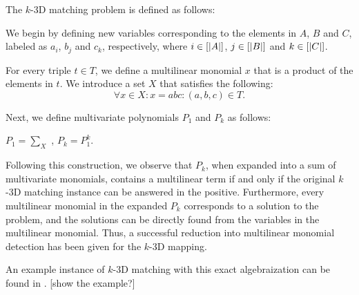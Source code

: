 The $k$-3D matching problem is defined as follows:

\begin{problem}
\end{problem}

We begin by defining new variables corresponding to the elements in $A$, $B$ and $C$, 
labeled as $a_i$, $b_j$ and $c_k$, respectively, where $i\in [{\left\vert A\right\vert}]$, $j\in
[{\left\vert B\right\vert}]$ and $k\in [{\left\vert C\right\vert}]$. 

For every triple $t \in T$, we define a multilinear monomial $x$ that is a
product of the elements in $t$. 
We introduce a set $X$ that satisfies the following:
\[
\forall x \in X: x = abc : (a, b, c) \in T.
\]

Next, we define multivariate polynomials $P_1$ and $P_k$ as follows:
\begin{center}$P_1 = \displaystyle \sum_{X}$ ,   $P_k = P_1^k$.\end{center}

Following this construction, we observe that $P_k$, when expanded into a sum of multivariate monomials, 
contains a multilinear term if and only if the original $k$-3D matching instance can be answered in the positive. 
Furthermore, every multilinear monomial in the expanded $P_k$ corresponds to a solution to the problem, and 
the solutions can be directly found from the variables in the multilinear monomial. Thus, 
a successful reduction into multilinear monomial detection has been given for the $k$-3D mapping.

An example instance of $k$-3D matching with this exact algebraization can be found in \cite{KouWil15}. [show the example?]


